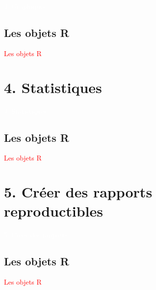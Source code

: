 \documentclass[11pt]{beamer}\usepackage[]{graphicx}\usepackage[]{color}
\begin{document}
\begin{frame}[plain]
\hspace*{-1.0cm}\parbox[t]{\textwidth}{
 \begin{center}
  \Huge{\textcolor{white}{3. Graphiques}}
 \end{center}
 }
\end{frame}

\subsection{Les objets R}

\begin{frame}
 \begin{center}
  \Huge{\textcolor{red}{Les objets R}}
 \end{center}
\end{frame}




\section{4. Statistiques}

\begin{frame}[plain]
\hspace*{-1.0cm}\parbox[t]{\textwidth}{
 \begin{center}
  \Huge{\textcolor{white}{4. Statistiques}}
 \end{center}
 }
\end{frame}

\subsection{Les objets R}

\begin{frame}
 \begin{center}
  \Huge{\textcolor{red}{Les objets R}}
 \end{center}
\end{frame}



\section{5. Cr\'{e}er des rapports reproductibles}

\begin{frame}[plain]
\hspace*{-1.0cm}\parbox[t]{\textwidth}{
 \begin{center}
  \Huge{\textcolor{white}{5. Cr\'{e}er des rapports}}
 \end{center}
 }
\end{frame}

\subsection{Les objets R}

\begin{frame}
 \begin{center}
  \Huge{\textcolor{red}{Les objets R}}
 \end{center}
\end{frame}
\end{document}
